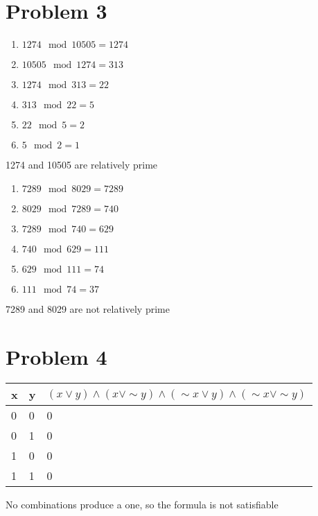 \documentclass{article}
\newenvironment{problem}[1]{
  \nobreak\section*{Problem #1}
}{}
\begin{document}
  \begin{problem}{3}
    \begin{enumerate}
      \item $1274 \mod{} 10505 = 1274$
      \item $10505 \mod{} 1274 = 313$
      \item $1274 \mod{} 313 = 22$
      \item $313 \mod{} 22 = 5$
      \item $22 \mod{} 5 = 2$
      \item $5 \mod{} 2 = 1$
    \end{enumerate}

    1274 and 10505 are relatively prime

    \pagebreak

    \begin{enumerate}
      \item $7289 \mod 8029 = 7289$
      \item $8029 \mod 7289 = 740$
      \item $7289 \mod 740 = 629$
      \item $740 \mod 629 = 111$
      \item $629 \mod 111 = 74$
      \item $111 \mod 74 = 37$
    \end{enumerate}

    7289 and 8029 are not relatively prime
  \end{problem}

  \begin{problem}{4}
    \begin{table}[h]
      \centering
      \begin{tabular}{lll}
      x & y & $(x \vee y) \wedge (x \vee \sim y) \wedge (\sim x \vee y) \wedge (\sim x \vee \sim y)$ \\ \hline
      0 & 0 & 0 \\
      0 & 1 & 0 \\
      1 & 0 & 0 \\
      1 & 1 & 0
      \end{tabular}
    \end{table}

    No combinations produce a one, so the formula is not satisfiable
  \end{problem}
\end{document}
